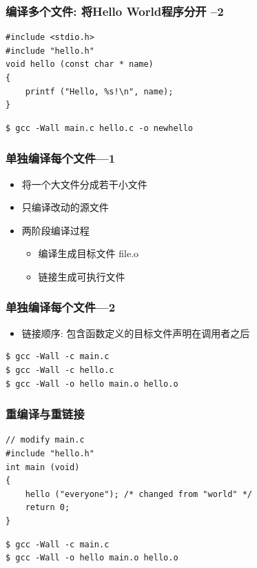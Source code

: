 \documentclass[compress]{beamer}
\begin{document}
\begin{frame}[fragile]
\frametitle{编译多个文件: 将Hello World程序分开 --2}
\begin{lstlisting}
#include <stdio.h>
#include "hello.h"
void hello (const char * name)
{
    printf ("Hello, %s!\n", name);
}
\end{lstlisting}
\begin{verbatim}
$ gcc -Wall main.c hello.c -o newhello
\end{verbatim}
\end{frame}


\begin{frame}
\frametitle{单独编译每个文件---1}

\begin{itemize}
\item 将一个大文件分成若干小文件
\item 只编译改动的源文件
\item 两阶段编译过程
    \begin{itemize}
    \item 编译生成目标文件 file.o
    \item 链接生成可执行文件
    \end{itemize}
\end{itemize}
\end{frame}

\begin{frame}[fragile]
\frametitle{单独编译每个文件---2}

\begin{itemize}
\item 链接顺序: 包含函数定义的目标文件声明在调用者之后
\end{itemize}

\begin{verbatim}
$ gcc -Wall -c main.c
$ gcc -Wall -c hello.c
$ gcc -Wall -o hello main.o hello.o
\end{verbatim}
\end{frame}

\begin{frame}[fragile]
\frametitle{重编译与重链接}
\begin{lstlisting}
// modify main.c
#include "hello.h"
int main (void)
{
    hello ("everyone"); /* changed from "world" */
    return 0;
}
\end{lstlisting}

\begin{verbatim}
$ gcc -Wall -c main.c
$ gcc -Wall -o hello main.o hello.o
\end{verbatim}

\end{frame}
\end{document}
